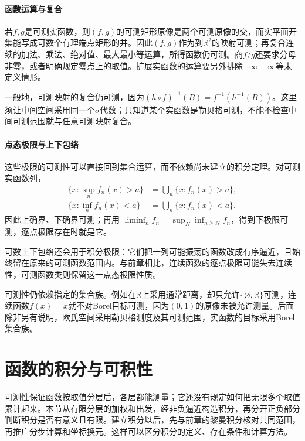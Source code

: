 \paragraph{函数运算与复合}

若$f,g$是可测实函数，则$(f,g)$的可测矩形原像是两个可测原像的交，而实平面开集能写成可数个有理端点矩形的并。因此$(f,g)$作为到$\mathbb R^2$的映射可测；再复合连续的加法、乘法、绝对值、最大最小等运算，所得函数仍可测。商$f/g$还要求分母非零，或者明确规定零点上的取值。扩展实函数的运算要另外排除$+\infty-\infty$等未定义情形。

一般地，可测映射的复合仍可测，因为$(h\circ f)^{-1}(B)=f^{-1}(h^{-1}(B))$。这里须让中间空间采用同一个$\sigma$代数；只知道某个实函数是勒贝格可测，不能不检查中间可测范围就与任意可测映射复合。

\paragraph{点态极限与上下包络}

这些极限的可测性可以直接回到集合运算，而不依赖尚未建立的积分定理。对可测实函数列，
\begin{align*}
 \{x:\sup_n f_n(x)>a\}&=\bigcup_n\{x:f_n(x)>a\},\\
 \{x:\inf_n f_n(x)<a\}&=\bigcup_n\{x:f_n(x)<a\}.
\end{align*}
因此上确界、下确界可测；再用
$\liminf_n f_n=\sup_N\inf_{n\geq N}f_n$，得到下极限可测，逐点极限存在时就是它。

可数上下包络还会用于积分极限：它们把一列可能振荡的函数改成有序逼近，且始终留在原来的可测函数范围内。与前章相比，连续函数的逐点极限可能失去连续性，可测函数类则保留这一点态极限性质。

可测性仍依赖指定的集合族。例如在$\mathbb R$上采用通常距离，却只允许$\{\varnothing,\mathbb R\}$可测，连续函数$f(x)=x$就不对Borel目标可测，因为$(0,1)$的原像未被允许测量。后面除非另有说明，欧氏空间采用勒贝格测度及其可测范围，实函数的目标采用Borel集合族。

\section{函数的积分与可积性}
\label{sec:analysis-integration-average}

可测性保证函数按取值分层后，各层都能测量；它还没有规定如何把无限多个取值累计起来。本节从有限分层的加权和出发，经非负逼近构造积分，再分开正负部分判断积分是否有意义且有限。建立积分以后，先与前章的黎曼积分核对共同范围，再推广分步计算和坐标换元。这样可以区分积分的定义、存在条件和计算方法。

